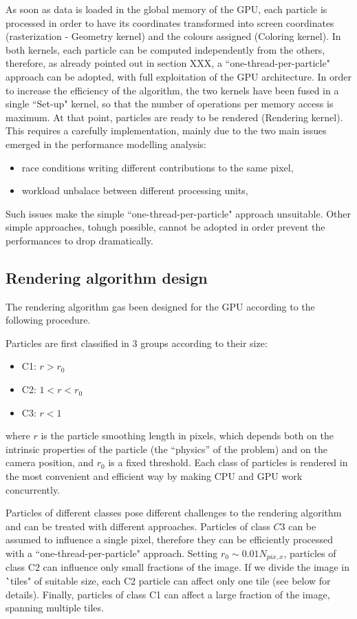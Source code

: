 \documentclass[11pt]{article}
\begin{document}
As soon as data is loaded in the global memory of the GPU, each particle is processed in order to have 
its coordinates transformed into screen coordinates (rasterization - Geometry kernel) 
and the colours assigned (Coloring kernel). In both kernels, each particle can be computed 
independently from the others, therefore, as already pointed out in section XXX, 
a ``one-thread-per-particle" approach can be adopted, with full exploitation of
the GPU architecture. In order to increase the efficiency of the algorithm, the two kernels 
have been fused in a single ``Set-up" kernel, 
so that the number of operations per memory access is maximum. 
At that point, particles are ready to be rendered (Rendering kernel).
This requires a carefully implementation, mainly due to the two main issues emerged 
in the performance modelling analysis:
\begin{itemize}
\item
race conditions writing different contributions to the same pixel,
\item
workload unbalace between different processing units,
\end{itemize}
Such issues make the simple ``one-thread-per-particle" approach unsuitable. Other simple 
approaches, tohugh possible, cannot be adopted in order prevent the performances to drop dramatically.

\subsection{Rendering algorithm design}

The rendering algorithm gas been designed for the GPU according to the following procedure.

Particles are first classified in 3 groups according to their size:
\begin{itemize}
\item 
C1: $r > r_0$
\item
C2: $1 < r < r_0$
\item
C3: $r < 1$
\end{itemize}
where $r$ is the particle smoothing length in pixels, which depends both on the 
intrinsic properties of the particle (the ``physics'' of the problem) 
and on the camera position, and $r_0$ is a fixed threshold. Each class of 
particles is rendered in the most convenient and efficient way by making CPU and GPU 
work concurrently.

Particles of different classes pose different challenges to the rendering 
algorithm and can be treated with different approaches. Particles of class $C3$ 
can be assumed to influence a single pixel, therefore they can be efficiently 
processed with a ``one-thread-per-particle" approach. Setting $r_0 \sim 0.01 N_{pix,x}$, 
particles of class C2 can influence only small fractions of the image. If 
we divide the image in \``tiles" of suitable size, each C2 particle can affect 
only one tile (see below for details). Finally, particles of class C1 can affect 
a large fraction of the image, spanning multiple tiles.
\end{document}
